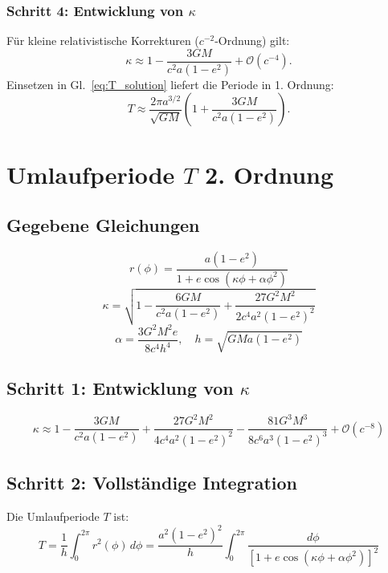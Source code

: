 \subsubsection*{Schritt 4: Entwicklung von $\kappa$}
Für kleine relativistische Korrekturen ($c^{-2}$-Ordnung) gilt:
\begin{equation}
    \kappa \approx 1 - \frac{3GM}{c^2 a(1-e^2)} + \mathcal{O}(c^{-4}).
    \label{eq:kappa_expansion}
\end{equation}
Einsetzen in Gl.~\eqref{eq:T_solution} liefert die Periode in 1. Ordnung:
\begin{equation}
    \boxed{
    T \approx \frac{2\pi a^{3/2}}{\sqrt{GM}} \left(1 + \frac{3GM}{c^2 a(1-e^2)}\right).
    }
    \label{eq:T_final_1}
\end{equation}

\newpage
\section{Umlaufperiode \( T \) 2. Ordnung}

\subsection*{Gegebene Gleichungen}
\begin{equation}
r(\phi) = \frac{a(1-e^2)}{1 + e\cos\left(\kappa\phi + \alpha\phi^2\right)} \label{eq:orbit}
\end{equation}
\begin{equation}
\kappa = \sqrt{1 - \frac{6GM}{c^2a(1-e^2)} + \frac{27G^2M^2}{2c^4a^2(1-e^2)^2}} \label{eq:kappa}
\end{equation}
\begin{equation}
\alpha = \frac{3G^2M^2e}{8c^4h^4}, \quad h = \sqrt{GMa(1-e^2)} \label{eq:alpha}
\end{equation}

\subsection*{Schritt 1: Entwicklung von \(\kappa\)}
\begin{equation}
\kappa \approx 1 - \frac{3GM}{c^2a(1-e^2)} + \frac{27G^2M^2}{4c^4a^2(1-e^2)^2} - \frac{81G^3M^3}{8c^6a^3(1-e^2)^3} + \mathcal{O}(c^{-8}) 
\end{equation}

\subsection*{Schritt 2: Vollständige Integration}
Die Umlaufperiode \( T \) ist:
\begin{equation}
T = \frac{1}{h} \int_0^{2\pi} r^2(\phi) \, d\phi = \frac{a^2(1-e^2)^2}{h} \int_0^{2\pi} \frac{d\phi}{\left[1 + e\cos\left(\kappa\phi + \alpha\phi^2\right)\right]^2} \label{eq:T_integral}
\end{equation}

